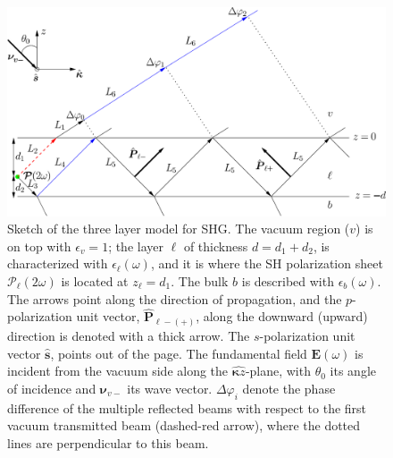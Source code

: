 \begin{figure}
\centering 
\includegraphics[scale=0.5]{content/figures/diag-3layer_MR_2w}
\caption{Sketch of the three layer model for SHG. The vacuum region ($v$) is on
top with $\epsilon_{v}=1$; the layer $\ell$ of thickness $d = d_{1} + d_{2}$, is
characterized with $\epsilon_{\ell}(\omega)$, and it is where the SH
polarization sheet $\boldsymbol{\mathcal{P}}_{\ell}(2\omega)$ is located at
$z_{\ell} = d_{1}$. The bulk $b$ is described with $\epsilon_{b}(\omega)$. The
arrows point along the direction of propagation, and the $p$-polarization unit
vector, $\hat{\mathbf{P}}_{\ell -(+)}$, along the downward (upward) direction is
denoted with a thick arrow. The $s$-polarization unit vector $\hat{\mathbf{s}}$,
points out of the page. The fundamental field $\mathbf{E}(\omega)$ is incident
from the vacuum side along the $\hat{\boldsymbol{\kappa}z}$-plane, with
$\theta_{0}$ its angle of incidence and $\boldsymbol{\nu}_{v-}$ its wave vector.
$\Delta\varphi_{i}$ denote the phase difference of the multiple reflected beams
with respect to the first vacuum transmitted beam (dashed-red arrow), where the
dotted lines are perpendicular to this beam.}
\label{fig:MR3layer2w}
\end{figure}

